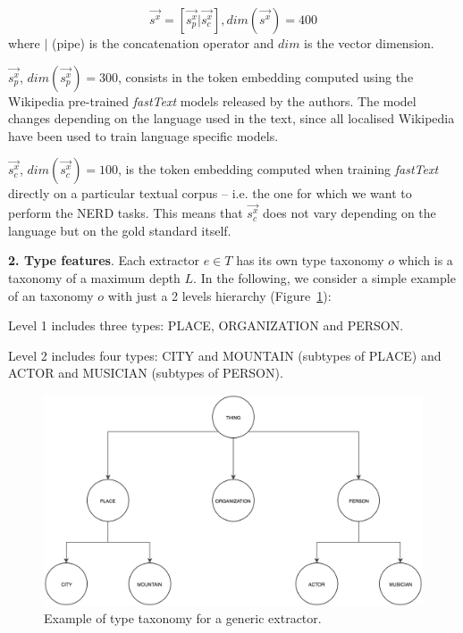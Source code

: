 \documentclass{llncs}
\newcommand{\figref}[1]{\mbox{Figure~\ref{#1}}}
\begin{document}
\begin{equation}
\vec{s^{x}} = \left [  \vec{s^{x}_p}|\vec{s^{x}_c} \right ], dim(\vec{s^{x}})=400
\end{equation}
where $|$ (pipe) is the concatenation operator and $dim$ is the vector dimension.

$\vec{s^{x}_p}$, $dim(\vec{s^{x}_p})=300$, consists in the token embedding computed using the Wikipedia pre-trained \textit{fastText} models released by the authors. The model changes depending on the language used in the text, since all localised Wikipedia have been used to train language specific models.

$\vec{s^{x}_c}$, $dim(\vec{s^{x}_c})=100$, is the token embedding computed when training \textit{fastText} directly on a particular textual corpus -- i.e. the one for which we want to perform the NERD tasks. This means that $\vec{s^{x}_c}$ does not vary depending on the language but on the gold standard itself.

\textbf{2. Type features}. Each extractor $e \in T$ has its own type taxonomy $o$ which is a taxonomy of a maximum depth $L$. In the following, we consider a simple example of an taxonomy $o$ with just a 2 levels hierarchy (\figref{fig:ontology}):
\begin{enumerate}
\begin{item}
Level 1 includes three types: PLACE, ORGANIZATION and PERSON.
\end{item}
\begin{item}
Level 2 includes four types: CITY and MOUNTAIN (subtypes of PLACE) and ACTOR and MUSICIAN (subtypes of PERSON). 
\end{item}
\end{enumerate}

\begin{figure}[t]
	\centering
    \includegraphics[scale=0.23]{onotlogy.png}
 	\caption{Example of type taxonomy for a generic extractor.}
 	\label{fig:ontology}
\end{figure}
\end{document}
